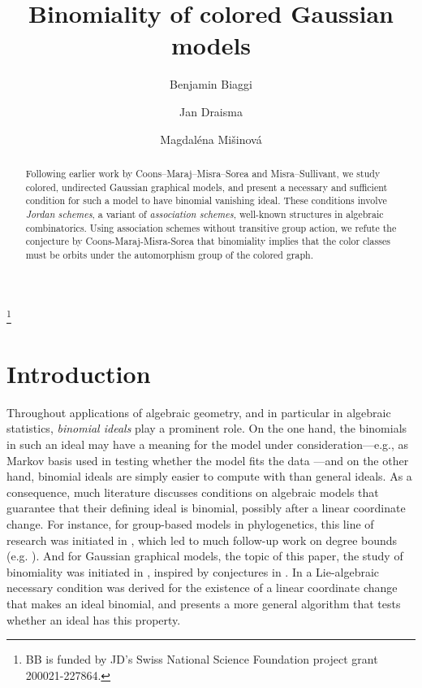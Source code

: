 \documentclass[a4paper, 11pt]{amsart}
\numberwithin{theorem}{section}
\begin{document}
\title{Binomiality of colored Gaussian models}

\author{Benjamin Biaggi}
\address{Mathematical Institute, University of Bern, Alpeneggstrasse
22, 3012 Bern, Switzerland}

\author{Jan Draisma}
\address{Mathematical Institute, University of Bern, Sidlerstrasse 5,
3012 Bern, Switzerland}

\author{Magdal\'ena Mi\v{s}inov\'a}
\address{Deparment of Mathematics and Statistics, University of Konstanz, Universitätsstrasse 10, 78464 Konstanz, Germany}
\thanks{BB is funded by JD's Swiss National Science Foundation project
grant 200021-227864.}

\maketitle
\begin{abstract}
Following earlier work by Coons--Maraj--Misra--Sorea and Misra--Sullivant,
we study colored, undirected Gaussian graphical models, and present a 
necessary and sufficient condition for such a model to have binomial
vanishing ideal. These conditions involve {\em Jordan schemes}, a
variant of {\em association schemes},
well-known structures in algebraic combinatorics. Using association
schemes without transitive group action, we refute the conjecture by
Coons-Maraj-Misra-Sorea that binomiality implies that the color classes
must be orbits under the automorphism group of the colored graph.
\end{abstract}

\section{Introduction}

Throughout applications of algebraic geometry, and in particular in
algebraic statistics, {\em binomial ideals} play a prominent role. On
the one hand, the binomials in such an ideal may have a meaning for
the model under consideration---e.g., as Markov basis used in testing
whether the model fits the data \cite{Diaconis98}---and on the other hand,
binomial ideals are simply easier to compute with than general ideals. As
a consequence, much literature discusses conditions on algebraic models
that guarantee that their defining ideal is binomial, possibly after a
linear coordinate change. For instance, for group-based models in phylogenetics, this
line of research was initiated in \cite{Sturmfels05b}, which led to much
follow-up work on degree bounds (e.g.  \cite{Michalek12,Noren12}). And for
Gaussian graphical models, the topic of this paper, the study of
binomiality was initiated in \cite{MS21}, inspired by conjectures in
\cite{Sturmfels10}. In
\cite{Maraj23} a Lie-algebraic necessary condition was derived for the
existence of a linear coordinate change that makes an ideal binomial,
and \cite{Kahle24} presents a more general algorithm that tests whether an ideal
has this property.
\end{document}
